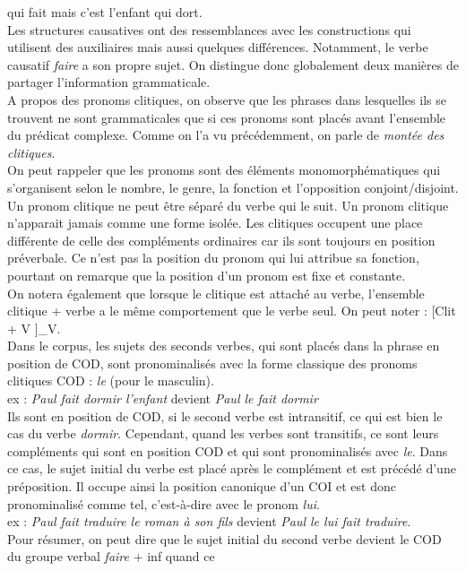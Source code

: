 	qui fait mais c'est l'enfant qui dort. \\
	Les structures causatives ont des ressemblances avec les constructions qui utilisent des auxiliaires mais aussi quelques 
	différences. Notamment, le verbe causatif \emph{faire} a son propre sujet. On distingue donc globalement deux manières
	de partager l'information grammaticale.
	\\
	A propos des pronoms clitiques, on observe que les phrases dans lesquelles ils se trouvent ne sont grammaticales que si 
	ces pronoms sont placés avant l'ensemble du prédicat complexe. Comme on l'a vu précédemment, on parle de 
	\emph{montée des clitiques}.\\
	On peut rappeler que les pronoms sont des éléments monomorphématiques qui s'organisent selon le nombre, le genre, la fonction
	et l'opposition conjoint/disjoint. Un pronom clitique ne peut être séparé du verbe qui le suit. Un pronom clitique n'apparait
	jamais comme une forme isolée. Les clitiques occupent une place différente de celle des compléments ordinaires car ils sont
	toujours en position préverbale. Ce n'est pas la position du pronom qui lui attribue sa fonction, pourtant on remarque que
	la position d'un pronom est fixe et constante.\\
	On notera également que lorsque le clitique est attaché au verbe, l'ensemble clitique + verbe a le même comportement que le 
	verbe seul. On peut noter : [Clit + V ]_{V}. \\
	Dans le corpus, les sujets des seconds verbes, qui sont placés dans la phrase en position de COD, sont pronominalisés avec 
	la forme classique des pronoms clitiques COD : \emph{le} (pour le masculin).\\
	ex : \emph{Paul fait dormir l'enfant} devient \emph{Paul le fait dormir}\\
	Ils sont en position de COD, si le second verbe est intransitif, ce qui est bien le cas du verbe \emph{dormir}. Cependant, 
	quand les verbes sont transitifs, ce sont leurs compléments qui sont en position COD et qui sont pronominalisés avec 
	\emph{le}. Dans ce cas, le sujet initial du verbe est placé après le complément et est précédé d'une préposition. Il occupe
	ainsi la position canonique d'un COI et est donc pronominalisé comme tel, c'est-à-dire avec le pronom \emph{lui}.\\
	ex : \emph{Paul fait traduire le roman à son fils} devient \emph{Paul le lui fait traduire}.\\
	Pour résumer, on peut dire que le sujet initial du second verbe devient le COD du groupe verbal \emph{faire} + inf quand ce 
